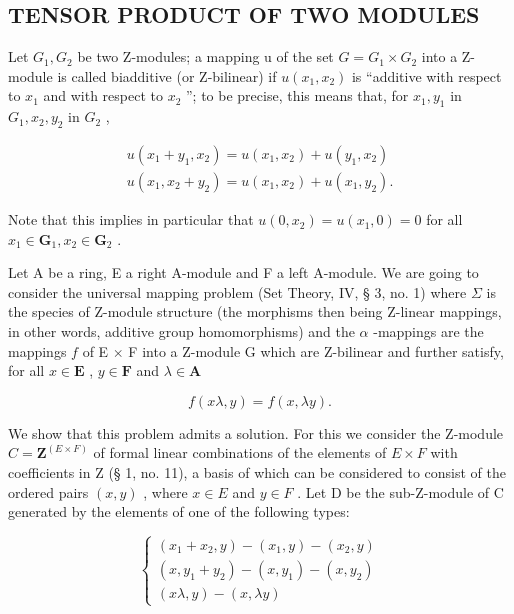 \subsection{TENSOR PRODUCT OF TWO MODULES}

Let \(G_{1}, G_{2}\) be two Z-modules; a mapping u of the set \(G = G_{1} \times G_{2}\) into a Z-module is called biadditive (or Z-bilinear) if \(u(x_{1}, x_{2})\) is ``additive with respect to \(x_{1}\) and with respect to \(x_{2}\) ''; to be precise, this means that, for \(x_{1}, y_{1}\) in \(G_{1}, x_{2}, y_{2}\) in \(G_{2}\) ,

\[
\begin{array}{l} u (x _ {1} + y _ {1}, x _ {2}) = u (x _ {1}, x _ {2}) + u (y _ {1}, x _ {2}) \\ u (x _ {1}, x _ {2} + y _ {2}) = u (x _ {1}, x _ {2}) + u (x _ {1}, y _ {2}). \end{array}
\]

Note that this implies in particular that \(u(0, x_2) = u(x_1, 0) = 0\) for all \(x_1 \in \mathbf{G}_1, x_2 \in \mathbf{G}_2\) .

Let A be a ring, E a right A-module and F a left A-module. We are going to consider the universal mapping problem (Set Theory, IV, § 3, no. 1) where \(\Sigma\) is the species of Z-module structure (the morphisms then being Z-linear mappings, in other words, additive group homomorphisms) and the \(\alpha\) -mappings are the mappings \(f\) of E \(\times\) F into a Z-module G which are Z-bilinear and further satisfy, for all \(x \in \mathbf{E}\) , \(y \in \mathbf{F}\) and \(\lambda \in \mathbf{A}\)

\[
f (x \lambda , y) = f (x, \lambda y).\tag{1}
\]

We show that this problem admits a solution. For this we consider the Z-module \(C = \mathbf{Z}^{(E \times F)}\) of formal linear combinations of the elements of \(E \times F\) with coefficients in Z (§ 1, no. 11), a basis of which can be considered to consist of the ordered pairs \((x, y)\) , where \(x \in E\) and \(y \in F\) . Let D be the sub-Z-module of C generated by the elements of one of the following types:

\[
\left\{ \begin{array}{l} (x _ {1} + x _ {2}, y) - (x _ {1}, y) - (x _ {2}, y) \\ (x, y _ {1} + y _ {2}) - (x, y _ {1}) - (x, y _ {2}) \\ (x \lambda , y) - (x, \lambda y) \end{array} \right.\tag{2}
\]

